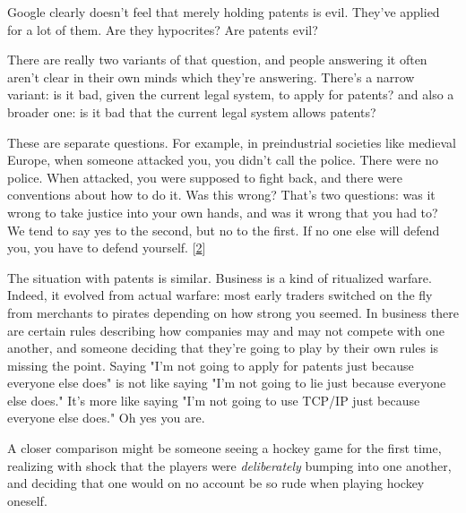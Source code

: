 Google clearly doesn't
                  feel that merely holding patents is evil. They've applied for
                  a lot of them. Are they hypocrites? Are patents evil?

There
                  are really two variants of that question, and people answering
                  it often aren't clear in their own minds which they're
                  answering. There's a narrow variant: is it bad, given the
                  current legal system, to apply for patents? and also a broader
                  one: is it bad that the current legal system allows
                  patents?

These are separate questions. For example,
                  in preindustrial societies like medieval Europe, when someone
                  attacked you, you didn't call the police. There were no
                  police. When attacked, you were supposed to fight back, and
                  there were conventions about how to do it. Was this wrong?
                  That's two questions: was it wrong to take justice into your
                  own hands, and was it wrong that you had to? We tend to say
                  yes to the second, but no to the first. If no one else will
                  defend you, you have to defend yourself.
                  [\href{\#f2n}{2}]

The situation with patents is similar. Business
                  is a kind of ritualized warfare. Indeed, it evolved from
                  actual warfare: most early traders switched on the fly from
                  merchants to pirates depending on how strong you seemed. In
                  business there are certain rules describing how companies may
                  and may not compete with one another, and someone deciding
                  that they're going to play by their own rules is missing the
                  point. Saying "I'm not going to apply for patents just because
                  everyone else does" is not like saying "I'm not going to lie
                  just because everyone else does." It's more like saying "I'm
                  not going to use TCP/IP just because everyone else does." Oh
                  yes you are.

A closer comparison might be someone
                  seeing a hockey game for the first time, realizing with shock
                  that the players were \emph{deliberately} bumping into one
                  another, and deciding that one would on no account be so rude
                  when playing hockey oneself.

